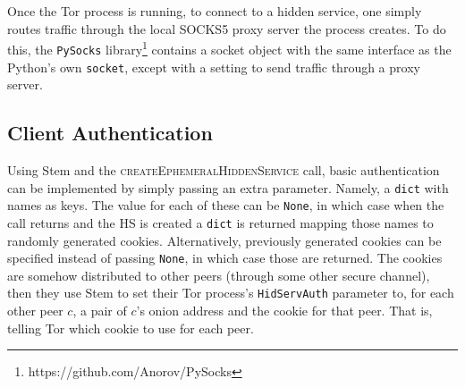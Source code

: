 \documentclass[diss.tex]{subfiles}
\begin{document}
Once the Tor process is running, to connect to a hidden service, one simply routes traffic through the local SOCKS5 proxy server the process creates. To do this, the \texttt{PySocks} library\footnote{https://github.com/Anorov/PySocks} contains a socket object with the same interface as the Python's own \texttt{socket}, except with a setting to send traffic through a proxy server.

\subsection{Client Authentication}
\label{sec:auth}

Using Stem and the \textsc{createEphemeralHiddenService} call, basic authentication can be implemented by simply passing an extra parameter. Namely, a \texttt{dict} with names as keys. The value for each of these can be \texttt{None}, in which case when the call returns and the HS is created a \texttt{dict} is returned mapping those names to randomly generated cookies. Alternatively, previously generated cookies can be specified instead of passing \texttt{None}, in which case those are returned. The cookies are somehow distributed to other peers (through some other secure channel), then they use Stem to set their Tor process's \texttt{HidServAuth} parameter to, for each other peer $c$, a pair of $c$'s onion address and the cookie for that peer. That is, telling Tor which cookie to use for each peer.
\end{document}
